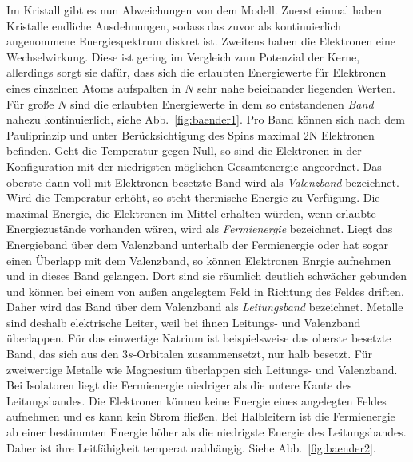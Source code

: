 Im Kristall gibt es nun Abweichungen von dem Modell. Zuerst einmal haben Kristalle 
endliche Ausdehnungen, sodass das zuvor als kontinuierlich angenommene 
Energiespektrum diskret ist. Zweitens haben die Elektronen eine Wechselwirkung. 
Diese ist gering im Vergleich zum Potenzial der Kerne, allerdings sorgt sie dafür, 
dass sich die erlaubten Energiewerte für Elektronen eines einzelnen Atoms aufspalten 
in $N$ sehr nahe beieinander liegenden Werten. Für große $N$ sind die erlaubten 
Energiewerte in dem so entstandenen \emph{Band} nahezu kontinuierlich, 
siehe Abb.~\ref{fig:baender1}. Pro Band können  
sich nach dem Pauliprinzip und unter Berücksichtigung des Spins maximal 2N Elektronen 
befinden. Geht die Temperatur gegen Null, so sind die Elektronen in der Konfiguration 
mit der niedrigsten möglichen Gesamtenergie angeordnet. Das oberste dann voll mit 
Elektronen besetzte Band wird als \emph{Valenzband} bezeichnet. Wird die Temperatur 
erhöht, so steht thermische Energie zu Verfügung. Die maximal Energie, die Elektronen 
im Mittel erhalten würden, wenn erlaubte Energiezustände vorhanden wären, wird als 
\emph{Fermienergie} bezeichnet. 
Liegt das Energieband über dem Valenzband unterhalb der Fermienergie oder hat sogar 
einen Überlapp mit dem Valenzband, so können Elektronen Enrgie aufnehmen und in dieses 
Band gelangen. Dort sind sie räumlich deutlich schwächer gebunden und können bei einem 
von außen angelegtem Feld in Richtung des Feldes driften. Daher wird das Band über dem 
Valenzband als \emph{Leitungsband} bezeichnet. Metalle sind deshalb elektrische Leiter, weil 
bei ihnen Leitungs- und Valenzband überlappen. Für das einwertige Natrium ist beispielsweise 
das oberste besetzte Band, das sich aus den 3$s$-Orbitalen zusammensetzt, nur halb besetzt. 
Für zweiwertige Metalle wie Magnesium überlappen sich Leitungs- und Valenzband. 
Bei Isolatoren liegt die Fermienergie niedriger als die untere Kante des Leitungsbandes. 
Die Elektronen können keine Energie eines angelegten Feldes aufnehmen und es kann kein 
Strom fließen. Bei Halbleitern ist die Fermienergie ab einer bestimmten Energie höher 
als die niedrigste Energie des Leitungsbandes. Daher ist ihre Leitfähigkeit 
temperaturabhängig. Siehe Abb.~\ref{fig:baender2}.\cite{demtroder2000experimentalphysik}\\ 

\newcommand{\picwidththeo}{0.48\textwidth}

